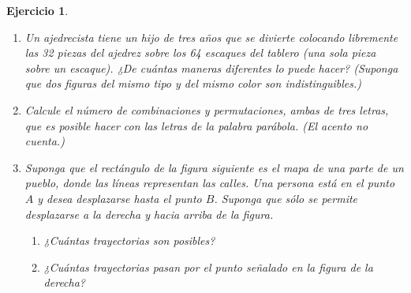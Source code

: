 \documentclass[12pt,twoside]{article}
\newtheorem{Ejer}{Ejercicio}
\begin{document}
\begin{Ejer}
\begin{enumerate}
\item Un ajedrecista tiene un hijo de tres años que se divierte colocando libremente las 32 piezas del ajedrez sobre los 64 escaques del tablero (una sola pieza sobre un escaque). ¿De cuántas maneras diferentes lo puede hacer? (Suponga que dos figuras del mismo tipo y del mismo color son indistinguibles.)

\item Calcule el número de combinaciones y permutaciones, ambas de tres letras, que es posible hacer con las letras de la palabra parábola. (El acento no cuenta.)

\item Suponga que el rectángulo de la figura siguiente es el mapa de una parte de un pueblo, donde las líneas representan las calles. Una persona está en el punto $A$ y desea desplazarse hasta el punto $B$. Suponga que sólo se permite desplazarse a la derecha y hacia arriba de la figura.
\begin{enumerate}
\item ¿Cuántas trayectorias son posibles?
\item ¿Cuántas trayectorias pasan por el punto señalado en la figura de la derecha?
\end{enumerate}

\end{enumerate}
\end{Ejer}
\end{document}

